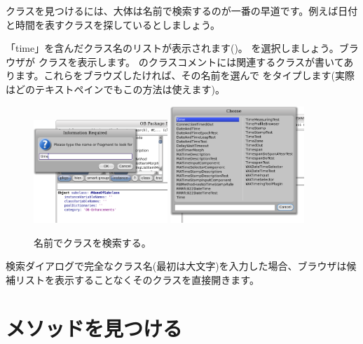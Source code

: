 \documentclass[a4paper,10pt,twoside]{book}
\begin{document}
クラスを見つけるには、大体は名前で検索するのが一番の早道です。例えば日付と時間を表すクラスを探しているとしましょう。

\noindent
「time」を含んだクラス名のリストが表示されます()。 を選択しましょう。ブラウザが  クラスを表示します。 のクラスコメントには関連するクラスが書いてあります。これらをブラウズしたければ、その名前を選んで  をタイプします(実際はどのテキストペインでもこの方法は使えます)。

\begin{figure}[hbt]
\centerline{
	\includegraphics[width=0.45\textwidth]{FindIt}
	\hspace{1cm}
	\includegraphics[width=0.45\textwidth]{TimeClasses}
}
\caption{名前でクラスを検索する。
}
\end{figure}

検索ダイアログで完全なクラス名(最初は大文字)を入力した場合、ブラウザは候補リストを表示することなくそのクラスを直接開きます。

\section{メソッドを見つける}
\end{document}
